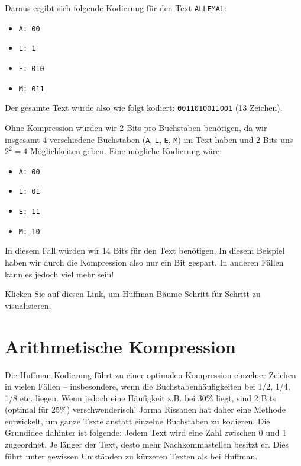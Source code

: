 \begin{myexercise}
\begin{myanswer}
		Daraus ergibt sich folgende Kodierung für den Text \texttt{ALLEMAL}:
		\begin{itemize}
			\item \texttt{A: 00}
			\item \texttt{L: 1}
			\item \texttt{E: 010}
			\item \texttt{M: 011}
		\end{itemize}
		Der gesamte Text würde also wie folgt kodiert: \texttt{0011010011001} (13 Zeichen).

		Ohne Kompression würden wir 2 Bits pro Buchstaben benötigen, da wir insgesamt 4 verschiedene Buchstaben (\texttt{A}, \texttt{L}, \texttt{E}, \texttt{M}) im Text haben und 2 Bits uns $2^2=4$ Möglichkeiten geben. Eine mögliche Kodierung wäre:

		\begin{itemize}
			\item \texttt{A: 00}
			\item \texttt{L: 01}
			\item \texttt{E: 11}
			\item \texttt{M: 10}
		\end{itemize}

		In diesem Fall würden wir 14 Bits für den Text benötigen. In diesem Beispiel haben wir durch die Kompression also nur ein Bit gespart. In anderen Fällen kann es jedoch viel mehr sein!
	\end{myanswer}
\end{myexercise}

\begin{myexercise}
	Klicken Sie auf \href{https://cmps-people.ok.ubc.ca/ylucet/DS/Huffman.html}{diesen Link}, um Huffman-Bäume Schritt-für-Schritt zu visualisieren.
\end{myexercise}

\section{Arithmetische Kompression}
Die Huffman-Kodierung führt zu einer optimalen Kompression einzelner Zeichen in vielen Fällen -- insbesondere, wenn die Buchstabenhäufigkeiten bei 1/2, 1/4, 1/8 etc. liegen. Wenn jedoch eine Häufigkeit z.B. bei 30\% liegt, sind 2 Bits (optimal für 25\%) verschwenderisch!
Jorma Rissanen hat daher eine Methode entwickelt, um ganze Texte anstatt einzelne Buchstaben zu kodieren. Die Grundidee dahinter ist folgende: Jedem Text wird eine Zahl zwischen 0 und 1 zugeordnet. Je länger der Text, desto mehr Nachkommastellen besitzt er. Dies führt unter gewissen Umständen zu kürzeren Texten als bei Huffman.

